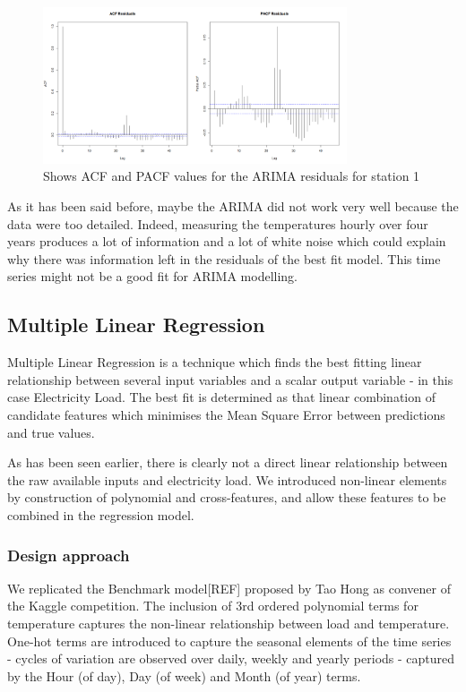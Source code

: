 \documentclass{article} %
\begin{document}
\begin{figure}[H]
  \centering
    \includegraphics[width=0.80\textwidth]{ACFandPACFTempArimaResults}
  \caption{Shows ACF and PACF values for the ARIMA residuals for station 1 }
\end{figure}

As it has been said before, maybe the ARIMA did not work very well because the data were too detailed. Indeed, measuring the temperatures hourly over four years produces a lot of information and a lot of white noise which could explain why there was information left in the residuals of the best fit model. This time series might not be a good fit for ARIMA modelling.

\subsection*{Multiple Linear Regression}
Multiple Linear Regression is a technique which finds the best fitting linear relationship between several input variables and a scalar output variable - in this case Electricity Load.  The best fit is determined as that linear combination of candidate features which minimises the Mean Square Error between predictions and true values.

As has been seen earlier, there is clearly not a direct linear relationship between the raw available inputs and electricity load.  We  introduced non-linear elements by construction of polynomial and cross-features, and allow these features to be combined in the regression model.

\subsubsection*{Design approach}
We replicated the Benchmark model[REF] proposed by Tao Hong as convener of the Kaggle competition.  The inclusion of 3rd ordered polynomial terms for temperature captures the non-linear relationship between load and temperature.  One-hot terms are introduced to capture the seasonal elements of the time series - cycles of variation are observed over daily, weekly and yearly periods - captured by the Hour (of day), Day (of week) and Month (of year) terms.
\end{document}
